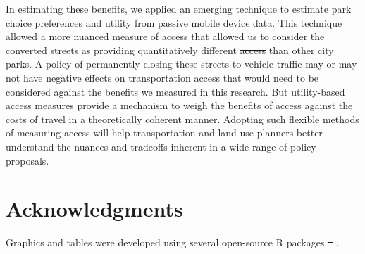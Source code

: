 \documentclass[3p, authoryear, review]{elsarticle} %
\providecommand{\DIFaddtex}[1]{{\protect\color{blue}\uwave{#1}}} %
\providecommand{\DIFdeltex}[1]{{\protect\color{red}\sout{#1}}}                      %
\providecommand{\DIFaddbegin}{} %
\providecommand{\DIFaddend}{} %
\providecommand{\DIFdelbegin}{} %
\providecommand{\DIFdelend}{} %
\providecommand{\DIFadd}[1]{\texorpdfstring{\DIFaddtex{#1}}{#1}} %
\providecommand{\DIFdel}[1]{\texorpdfstring{\DIFdeltex{#1}}{}} %
\newcommand{\DIFscaledelfig}{0.5}
\newlength{\DIFdelgraphicswidth} %
\newlength{\DIFdelgraphicsheight} %
\newcommand{\DIFaddincludegraphics}[2][]{{\color{blue}\fbox{\DIFOincludegraphics[#1]{#2}}}} %
\newcommand{\DIFdelincludegraphics}[2][]{%
\sbox{\DIFdelgraphicsbox}{\DIFOincludegraphics[#1]{#2}}%
\settoboxwidth{\DIFdelgraphicswidth}{\DIFdelgraphicsbox} %
\settoboxtotalheight{\DIFdelgraphicsheight}{\DIFdelgraphicsbox} %
\scalebox{\DIFscaledelfig}{%
\parbox[b]{\DIFdelgraphicswidth}{\usebox{\DIFdelgraphicsbox}\\[-\baselineskip] \rule{\DIFdelgraphicswidth}{0em}}\llap{\resizebox{\DIFdelgraphicswidth}{\DIFdelgraphicsheight}{%
\setlength{\unitlength}{\DIFdelgraphicswidth}%
\begin{picture}(1,1)%
\thicklines\linethickness{2pt} %
{\color[rgb]{1,0,0}\put(0,0){\framebox(1,1){}}}%
{\color[rgb]{1,0,0}\put(0,0){\line( 1,1){1}}}%
{\color[rgb]{1,0,0}\put(0,1){\line(1,-1){1}}}%
\end{picture}%
}\hspace*{3pt}}} %
} %
\DeclareRobustCommand{\DIFaddbegin}{\DIFOaddbegin \let\includegraphics\DIFaddincludegraphics} %
\DeclareRobustCommand{\DIFaddend}{\DIFOaddend \let\includegraphics\DIFOincludegraphics} %
\DeclareRobustCommand{\DIFdelbegin}{\DIFOdelbegin \let\includegraphics\DIFdelincludegraphics} %
\DeclareRobustCommand{\DIFdelend}{\DIFOaddend \let\includegraphics\DIFOincludegraphics} %
\begin{document}
In estimating these benefits, we applied an emerging technique to estimate park
choice preferences and utility from passive mobile device data. This technique
allowed a more nuanced measure of access that allowed us to consider the
converted streets as providing quantitatively different \DIFdelbegin \DIFdel{access }\DIFdelend \DIFaddbegin \DIFadd{amenities }\DIFaddend than other city
parks. A policy of permanently closing these streets to vehicle traffic may or
may not have negative effects on transportation access that would need to be
considered against the benefits we measured in this research. But utility-based
access measures provide a mechanism to weigh the benefits of access against the
costs of travel in a theoretically coherent manner. Adopting such flexible
methods of measuring access will help transportation and land use planners
better understand the nuances and tradeoffs inherent in a wide range of policy
proposals.

\hypertarget{acknowledgments}{%
\section*{Acknowledgments}\label{acknowledgments}}

Graphics and tables were developed using several open-source R packages
\DIFdelbegin \DIFdel{\mbox{%
\citep{ggmap, modelsummary, wesanderson}}\hspace{0pt}%
}\DIFdelend \DIFaddbegin \DIFadd{\mbox{%
\citep{ggspatial, modelsummary, wesanderson}}\hspace{0pt}%
}\DIFaddend .


\end{document}
